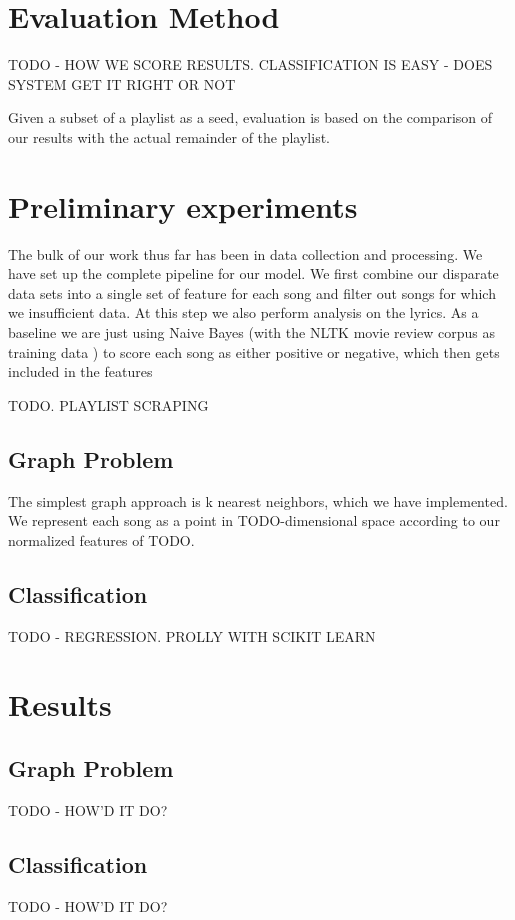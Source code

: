 \documentclass[10pt,journal,compsoc]{IEEEtran}
\begin{document}
\section{Evaluation Method}
TODO - HOW WE SCORE RESULTS. CLASSIFICATION IS EASY - DOES SYSTEM GET IT RIGHT OR NOT

Given a subset of a playlist as a seed, evaluation is based on the comparison of our results with the actual remainder of the playlist.

\section{Preliminary experiments}
The bulk of our work thus far has been in data collection and processing. We have set up the complete pipeline for our model. We first combine our disparate data sets into a single set of feature for each song and filter out songs for which we insufficient data. At this step we also perform analysis on the lyrics. As a baseline we are just using Naive Bayes (with the NLTK movie review corpus as training data \cite{nltk}) to score each song as either positive or negative, which then gets included in the features

TODO. PLAYLIST SCRAPING

\subsection{Graph Problem}
The simplest graph approach is k nearest neighbors, which we have implemented. We represent each song as a point in TODO-dimensional space according to our normalized features of TODO.

\subsection{Classification}
TODO - REGRESSION. PROLLY WITH SCIKIT LEARN

\section{Results}

\subsection{Graph Problem}
TODO - HOW'D IT DO?

\subsection{Classification}
TODO - HOW'D IT DO?
\end{document}
